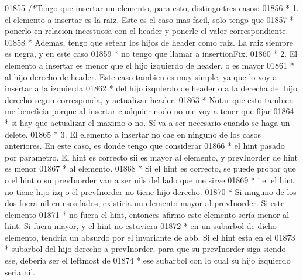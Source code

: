 \begin{DoxyCode}
01855             \textcolor{comment}{/*Tengo que insertar un elemento, para esto, distingo tres casos:}
01856 \textcolor{comment}{            * 1. el elemento a insertar es la raiz. Este es el caso mas facil, solo tengo que}
01857 \textcolor{comment}{            * ponerlo en relacion incestuosa con el header y ponerle el valor correspondiente.}
01858 \textcolor{comment}{            * Ademas, tengo que setear los hijos de header como raiz. La raiz siempre es negra, y en este
       caso}
01859 \textcolor{comment}{            * no tengo que llamar a insertionFix.}
01860 \textcolor{comment}{            * 2. El elemento a insertar es menor que el hijo izquierdo de header, o es mayor}
01861 \textcolor{comment}{            * al hijo derecho de header. Este caso tambien es muy simple, ya que lo voy a insertar a la
       izquierda}
01862 \textcolor{comment}{            * del hijo izquierdo de header o a la derecha del hijo derecho segun corresponda, y actualizar
       header.}
01863 \textcolor{comment}{            * Notar que esto tambien me beneficia porque al insertar cualquier nodo no me voy a tener que
       fijar}
01864 \textcolor{comment}{            * si hay que actualizar el maximo o no. Sí va a ser necesario cuando se haga un delete.}
01865 \textcolor{comment}{            * 3. El elemento a insertar no cae en ninguno de los casos anteriores. En este caso, es donde
       tengo que considerar}
01866 \textcolor{comment}{            * el hint pasado por parametro. El hint es correcto sii es mayor al elemento, y prevInorder de
       hint es menor}
01867 \textcolor{comment}{            * al elemento.}
01868 \textcolor{comment}{            * Si el hint es correcto, se puede probar que o el hint o su prevInorder van a ser nils del
       lado que me sirve}
01869 \textcolor{comment}{            * i.e. el hint no tiene hijo izq o el prevInorder no tiene hijo derecho.}
01870 \textcolor{comment}{            * Si ninguno de los dos fuera nil en esos lados, existiria un elemento mayor al prevInorder. Si
       este elemento}
01871 \textcolor{comment}{            * no fuera el hint, entonces afirmo este elemento sería menor al hint. Si fuera mayor, y el
       hint no estuviera}
01872 \textcolor{comment}{            * en un subarbol de dicho elemento, tendria un absurdo por el invariante de abb. Si el hint
       esta en el}
01873 \textcolor{comment}{            * subarbol del hijo derecho a prevInorder, para que su prevInorder siga siendo ese, deberia ser
       el leftmost de}
01874 \textcolor{comment}{            * ese subarbol con lo cual su hijo izquierdo seria nil.}

\end{DoxyCode}
